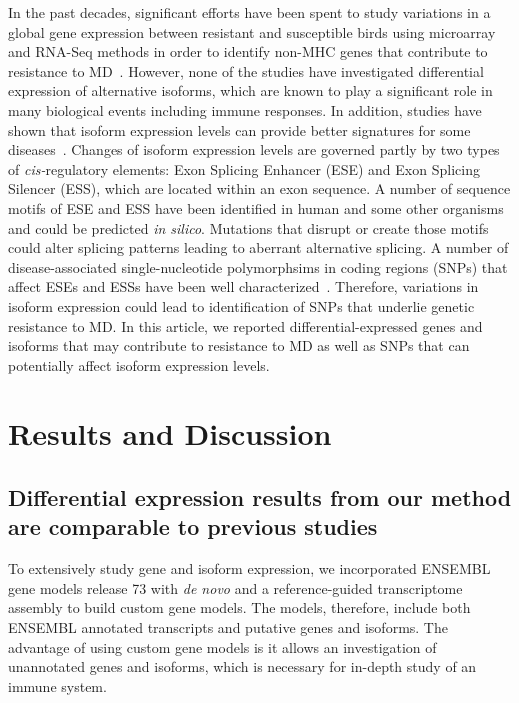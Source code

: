 \documentclass[10pt]{article}
\begin{document}
In the past decades, significant efforts have been spent to study variations in
a global gene expression between resistant and susceptible birds using
microarray and RNA-Seq methods in order to identify non-MHC genes that
contribute to resistance to
MD~\cite{sarson2008transcriptional,morgan2001induction,vallejo1998genetic,yonash1999high,bumstead1998genomic}.
However, none of the studies have investigated differential expression of
alternative isoforms, which are known to play a significant role in many
biological events including immune responses.  In addition, studies have shown
that isoform expression levels can provide better signatures for some
diseases~\cite{zhang2013isoform}.  Changes of isoform expression levels are
governed partly by two types of {\em cis-}regulatory elements: Exon Splicing
Enhancer (ESE) and Exon Splicing Silencer (ESS), which are located within an
exon sequence.  A number of sequence motifs of ESE and ESS have been identified
in human and some other organisms and could be predicted {\em in silico}.
Mutations that disrupt or create those motifs could alter splicing patterns
leading to aberrant alternative splicing.  A number of disease-associated
single-nucleotide polymorphsims in coding regions (SNPs) that affect ESEs and
ESSs have been well characterized~\cite{blencowe2000exonic, wang2007splicing}.
Therefore, variations in isoform expression could lead to identification of SNPs
that underlie genetic resistance to MD.  In this article, we reported
differential-expressed genes and isoforms that may contribute to resistance to
MD as well as SNPs that can potentially affect isoform expression levels.

\section*{Results and Discussion}

\subsection*{Differential expression results from our method are comparable to
previous studies}

To extensively study gene and isoform expression, we incorporated ENSEMBL gene
models release 73 with {\em de novo} and a reference-guided transcriptome
assembly to build custom gene models.  The models, therefore, include both
ENSEMBL annotated transcripts and putative genes and isoforms.  The advantage of
using custom gene models is it allows an investigation of unannotated genes and
isoforms, which is necessary for in-depth study of an immune system.
\end{document}
